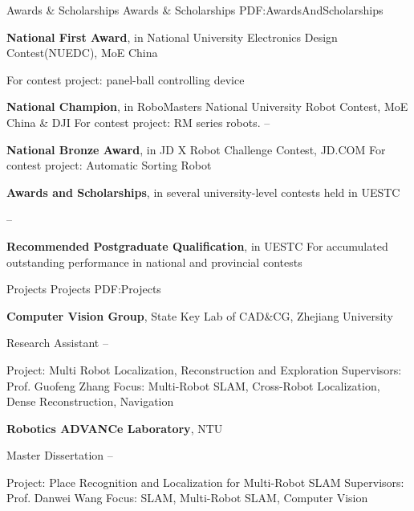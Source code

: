 \documentclass[letterpaper,MMMyyyy,nonstopmode]{simpleresumecv}
\begin{document}
\begin{Body}

\Section
{Awards \&\newline
	Scholarships}
{Awards \& Scholarships}
{PDF:AwardsAndScholarships}

\Entry
\textbf{National First Award},
in National University Electronics Design Contest(NUEDC), 
MoE China

\BulletItem
For contest project: panel-ball controlling device
\hfill
{}

\Gap
\Entry
\textbf{National Champion},
in RoboMasters National University Robot Contest,
MoE China \& DJI
\BulletItem
For contest project: RM series robots.
\hfill
{} --

\Gap
\Entry
\textbf{National Bronze Award},
in JD X Robot Challenge Contest,
JD.COM
\BulletItem
For contest project: Automatic Sorting Robot
\hfill
{}

\Gap
\Entry
\textbf{Awards and Scholarships}, 
in several university-level contests held in UESTC

\hfill
{} --

\Gap
\Entry
\textbf{Recommended Postgraduate Qualification},
in UESTC
\BulletItem
For accumulated outstanding performance in national and provincial contests
\hfill
{}



\Section
{Projects}
{Projects}
{PDF:Projects}

\Entry
{\textbf{Computer Vision Group}},
State Key Lab of CAD\&CG, Zhejiang University

\BulletItem
Research Assistant
\hfill
{} --
\begin{Detail}
\SubBulletItem
Project:
Multi Robot Localization, Reconstruction and Exploration
\SubBulletItem
Supervisors:
Prof. Guofeng Zhang
\SubBulletItem
Focus:
Multi-Robot SLAM, Cross-Robot Localization, Dense Reconstruction, Navigation
\end{Detail}

\Gap
\Entry
{\textbf{Robotics ADVANCe Laboratory}},
NTU

\BulletItem
Master Dissertation
\hfill
{} --
\begin{Detail}
\SubBulletItem
Project:
Place Recognition and Localization for Multi-Robot SLAM \cite{xiangyu2019quantitative}
\SubBulletItem
Supervisors:
Prof. Danwei Wang
\SubBulletItem
Focus:
SLAM, Multi-Robot SLAM, Computer Vision
\end{Detail}


\end{Body}
\end{document}
